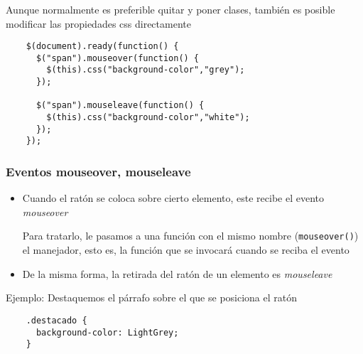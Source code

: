 \documentclass[ucs]{beamer}
\begin{document}
\begin{frame}[fragile]
\frametitle{}
Aunque normalmente es preferible quitar y poner clases, también
es posible modificar las propiedades css directamente

  \begin{scriptsize}
  \begin{verbatim}
    $(document).ready(function() {
      $("span").mouseover(function() {
        $(this).css("background-color","grey");
      });

      $("span").mouseleave(function() {
        $(this).css("background-color","white");
      });
    });
  \end{verbatim}
  \end{scriptsize}

\end{frame}



\begin{frame}[fragile]
\frametitle{Eventos mouseover, mouseleave}

\begin{itemize}
\item
Cuando el ratón se coloca sobre cierto elemento, este recibe
el evento 
\emph{mouseover}

Para tratarlo, le pasamos a una función con el mismo nombre
(\verb|mouseover()|) el manejador, esto es, la función
que se invocará cuando se reciba el evento

\item
De la misma forma, la retirada del ratón de un elemento es
\emph{mouseleave}
\end{itemize}
Ejemplo:
Destaquemos el párrafo sobre el que se posiciona el ratón

  \begin{scriptsize}
  \begin{verbatim}
    .destacado {
      background-color: LightGrey;
    }
  \end{verbatim}
  \end{scriptsize}

\end{frame}
\end{document}
